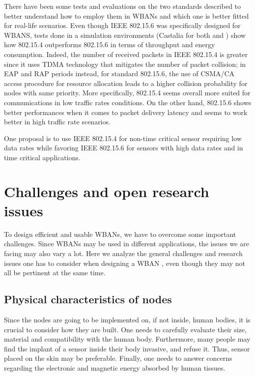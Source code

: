 \documentclass[conference]{IEEEtran}
\begin{document}
There have been some tests and evaluations on the two standards described to better understand how to employ them in WBANs and which one is better fitted for real-life scenarios. Even though IEEE 802.15.6 was specifically designed for WBANS, tests done in a simulation environments (Castalia for both \cite{nabila2019qos} and \cite{toumanari2014performance}) show how 802.15.4 outperforms 802.15.6 in terms of throughput and energy consumption. Indeed, the number of received packets in IEEE 802.15.4 is greater since it uses TDMA technology that mitigates the number of packet collision; in EAP and RAP periods instead, for standard 802.15.6, the use of CSMA/CA access procedure for resource allocation leads to a higher collision probability for nodes with same priority. More specifically, 802.15.4 seems overall more suited for communications in low traffic rates conditions. On the other hand, 802.15.6 shows better performances when it comes to packet delivery latency and seems to work better in high traffic rate scenarios.

One proposal \cite{nabila2019qos} is to use IEEE 802.15.4 for non-time critical sensor requiring low data rates while favoring IEEE 802.15.6 for sensors with high data rates and in time critical applications. 

\section{Challenges and open research issues}
To design efficient and usable WBANs, we have to overcome some important challenges. Since WBANs may be used in different applications, the issues we are facing may also vary a lot. Here we analyze the general challenges and research issues one has to consider when designing a WBAN \cite{cao2009enabling}, even though they may not all be pertinent at the same time.

\subsection {Physical characteristics of nodes}
Since the nodes are going to be implemented on, if not inside, human bodies, it is crucial to consider how they are built. One needs to carefully evaluate their size, material and compatibility with the human body. Furthermore, many people may find the implant of a sensor inside their body invasive, and refuse it. Thus, sensor placed on the skin may be preferable. Finally, one needs to answer concerns regarding the electronic and magnetic energy absorbed by human tissues.
\end{document}

